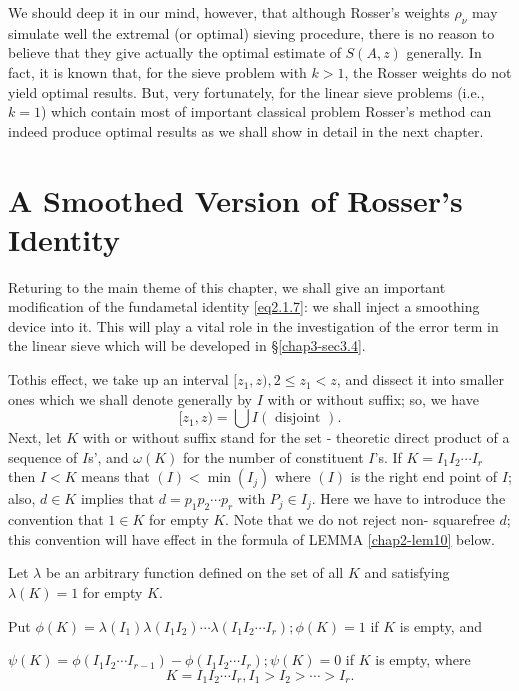 We should deep it in our mind, however, that although Rosser's weights
$\rho_\nu$ may simulate well the extremal (or optimal) sieving
procedure, there is no reason to believe that they give actually the
optimal estimate of $S(A,z)$ generally. In fact, it is known that, for
the sieve problem with $k >1$, the Rosser weights do not yield optimal
results. But, very fortunately, for the linear sieve problems (i.e., $k
=1$) which contain most of important classical problem Rosser's method
can indeed produce optimal results as we shall show in detail in the
next chapter. 

\section{A Smoothed Version of Rosser's Identity}\label{chap2-sec2.3} %

Returing to the main theme of this chapter, we shall give an important
modification of the fundametal identity \eqref{eq2.1.7}: we shall inject a
smoothing device into it. This will play a vital role in the
investigation of the error term in the linear sieve which will be
developed in \S \ref{chap3-sec3.4}. 

To\pageoriginale this effect, we take up an interval $[z_1, z), 2 \le
  z_1 < z$, and 
  dissect it into smaller ones which we shall denote generally by $I$
  with or without suffix; so, we have  
$$
[ z_1,  z ) = \bigcup I (\text { disjoint }). 
$$
Next, let $K$ with or without suffix stand for the set - theoretic
direct product of a sequence of $I$s', and $\omega (K)$ for the number
of constituent $I$'s. If $K = I_1 I_2 \cdots I_r$ then $I < K$ means
that $(I) < \min (I_j)$ where $(I)$ is the right end point of $I$;
also, $d \in K$ implies that $d = p_1 p_2 \cdots p_r$ with $P_j \in
I_j$. Here we have to introduce the convention that $1 \in K$ for
empty $K$. Note that we do not reject non- squarefree $d$; this
convention will have effect in the formula of LEMMA \ref{chap2-lem10} below. 

\begin{theorem}\label{chap2-thm8}%
  Let $\lambda$ be an arbitrary function defined on the set of all
  $K$ and satisfying $\lambda(K) = 1$ for empty $K$. 
  
  Put  
  $ \phi(K) = \lambda (I_1) \lambda (I_1 I_2) \cdots \lambda (I_1 I_2
  \cdots I_r) ; \phi (K) = 1 $
  if $K$ is empty,  and 
 
  $\psi(K) = \phi (I_1 I_2 \cdots  I_{r-1} )- \phi (I_1 I_2 \cdots I_r)
  ; \psi (K) = 0 $
  if $K$ is empty, where 
  $$
  K = I_1 I_2 \cdots I_r,  I_1 > I_2 > \cdots > I_r. 
  $$
\end{theorem}

